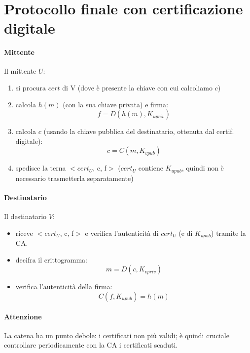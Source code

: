 \section{Protocollo finale con certificazione digitale}
\paragraph{Mittente} Il mittente $U$:
\begin{enumerate}
    \item si procura $cert$ di V (dove è presente la chiave con cui calcoliamo $c$)

    \item calcola $h(m)$ (con la sua chiave privata) e firma:
    $$ f = D(h(m),K_{upriv}) $$

    \item calcola $c$ (usando la chiave pubblica del destinatario, ottenuta dal certif. digitale):
    $$ c = C(m, K_{vpub}) $$

    \item spedisce la terna $<cert_U$, c, f$>$ ($cert_U$ contiene $K_{upub}$, quindi non è necessario trasmetterla separatamente)
\end{enumerate}
\paragraph{Destinatario} Il destinatario $V$:
\begin{itemize}
    \item riceve $<cert_U$, c, f$>$ e verifica l'autenticità di $cert_U$ (e di $K_{upub}$) tramite la CA.

    \item decifra il crittogramma:
    $$ m=D(c, K_{vpriv}) $$

    \item verifica l'autenticità della firma:
    $$ C(f, K_{upub}) = h(m) $$
\end{itemize}
\paragraph{Attenzione} La catena ha un punto debole: i certificati non più validi; è quindi cruciale controllare periodicamente con la CA i certificati scaduti.
